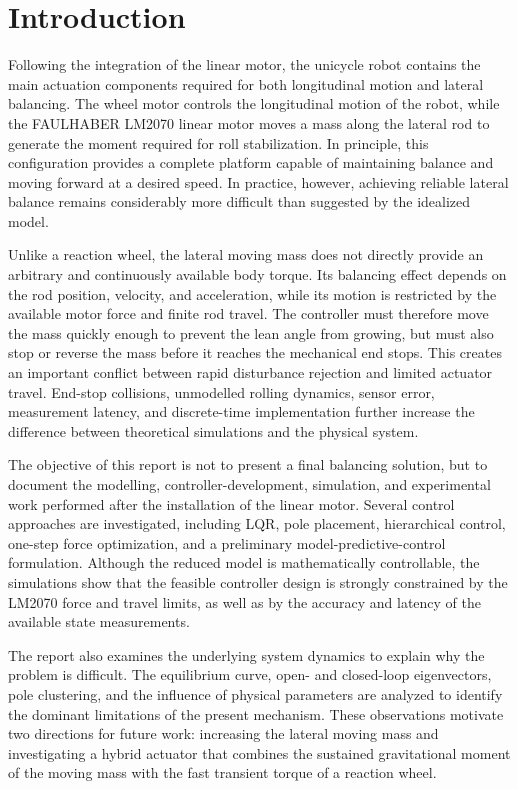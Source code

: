 \chapter{Introduction}
\label{chap:introduction}

Following the integration of the linear motor, the unicycle robot contains the main actuation components required for both longitudinal motion and lateral balancing. The wheel motor controls the longitudinal motion of the robot, while the FAULHABER LM2070 linear motor moves a mass along the lateral rod to generate the moment required for roll stabilization. In principle, this configuration provides a complete platform capable of maintaining balance and moving forward at a desired speed. In practice, however, achieving reliable lateral balance remains considerably more difficult than suggested by the idealized model.

Unlike a reaction wheel, the lateral moving mass does not directly provide an arbitrary and continuously available body torque. Its balancing effect depends on the rod position, velocity, and acceleration, while its motion is restricted by the available motor force and finite rod travel. The controller must therefore move the mass quickly enough to prevent the lean angle from growing, but must also stop or reverse the mass before it reaches the mechanical end stops. This creates an important conflict between rapid disturbance rejection and limited actuator travel. End-stop collisions, unmodelled rolling dynamics, sensor error, measurement latency, and discrete-time implementation further increase the difference between theoretical simulations and the physical system.

The objective of this report is not to present a final balancing solution, but to document the modelling, controller-development, simulation, and experimental work performed after the installation of the linear motor. Several control approaches are investigated, including LQR, pole placement, hierarchical control, one-step force optimization, and a preliminary model-predictive-control formulation. Although the reduced model is mathematically controllable, the simulations show that the feasible controller design is strongly constrained by the LM2070 force and travel limits, as well as by the accuracy and latency of the available state measurements.

The report also examines the underlying system dynamics to explain why the problem is difficult. The equilibrium curve, open- and closed-loop eigenvectors, pole clustering, and the influence of physical parameters are analyzed to identify the dominant limitations of the present mechanism. These observations motivate two directions for future work: increasing the lateral moving mass and investigating a hybrid actuator that combines the sustained gravitational moment of the moving mass with the fast transient torque of a reaction wheel.

